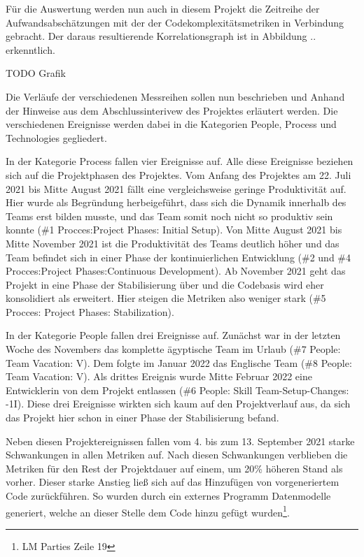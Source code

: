 Für die Auswertung werden nun auch in diesem Projekt die Zeitreihe der
Aufwandsabschätzungen mit der der Codekomplexitätsmetriken in Verbindung
gebracht. Der daraus resultierende Korrelationsgraph ist in Abbildung ..
erkenntlich.

TODO Grafik

Die Verläufe der verschiedenen Messreihen sollen nun beschrieben und
Anhand der Hinweise aus dem Abschlussinterivew des Projektes erläutert
werden. Die verschiedenen Ereignisse werden dabei in die Kategorien
People, Process und Technologies gegliedert.

In der Kategorie Process fallen vier Ereignisse auf. Alle diese
Ereignisse beziehen sich auf die Projektphasen des Projektes. Vom Anfang
des Projektes am 22. Juli 2021 bis Mitte August 2021 fällt eine
vergleichsweise geringe Produktivität auf. Hier wurde als Begründung
herbeigeführt, dass sich die Dynamik innerhalb des Teams erst bilden
musste, und das Team somit noch nicht so produktiv sein konnte (\#1
Procces:Project Phases: Initial Setup). Von Mitte August 2021 bis Mitte
November 2021 ist die Produktivität des Teams deutlich höher und das
Team befindet sich in einer Phase der kontinuierlichen Entwicklung (\#2
und \#4 Procces:Project Phases:Continuous Development). Ab November 2021
geht das Projekt in eine Phase der Stabilisierung über und die Codebasis
wird eher konsolidiert als erweitert. Hier steigen die Metriken also
weniger stark (\#5 Procces: Project Phases: Stabilization).

In der Kategorie People fallen drei Ereignisse auf. Zunächst war in der
letzten Woche des Novembers das komplette ägyptische Team im Urlaub (\#7
People: Team Vacation: V). Dem folgte im Januar 2022 das Englische Team
(\#8 People: Team Vacation: V). Als drittes Ereignis wurde Mitte Februar
2022 eine Entwicklerin von dem Projekt entlassen (\#6 People: Skill
Team-Setup-Changes: -1I). Diese drei Ereignisse wirkten sich kaum auf
den Projektverlauf aus, da sich das Projekt hier schon in einer Phase
der Stabilisierung befand.

Neben diesen Projektereignissen fallen vom 4. bis zum 13. September 2021
starke Schwankungen in allen Metriken auf. Nach diesen Schwankungen
verblieben die Metriken für den Rest der Projektdauer auf einem, um 20\%
höheren Stand als vorher. Dieser starke Anstieg ließ sich auf das
Hinzufügen von vorgeneriertem Code zurückführen. So wurden durch ein
externes Programm Datenmodelle generiert, welche an dieser Stelle dem
Code hinzu gefügt wurden\footnote{LM Parties Zeile 19}.

